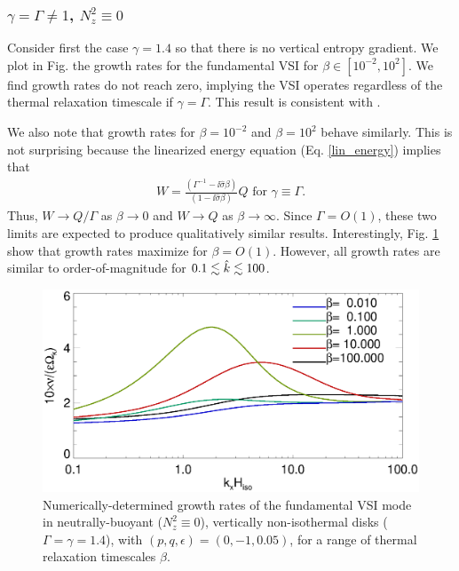 \subsubsection{$\gamma=\Gamma \neq 1$, $N_z^2\equiv 0$}
Consider first the case $\gamma=1.4$ so that there is no vertical
entropy gradient. We plot in Fig. the growth rates for the
fundamental VSI for $\beta\in[10^{-2},10^{2}]$. We find growth rates
do not reach zero, implying the VSI operates regardless of the thermal
relaxation timescale if $\gamma=\Gamma$. This result is consistent
with \cite{nelson13}.  

We also note that growth rates for $\beta = 10^{-2}$ and
$\beta=10^{2}$ behave similarly. This is not surprising because
the linearized energy equation (Eq. \ref{lin_energy}) implies that 
\begin{align}
  W = \frac{\left(\Gamma^{-1} -
      \ii\hat{\sigma}\beta\right)}{\left(1-\ii\hat{\sigma}\beta\right)}
  Q \text{ for } \gamma\equiv \Gamma.   
\end{align}
Thus, $W \to Q/\Gamma$ as $\beta\to0$ and $W\to Q$ as
$\beta\to\infty$. Since $\Gamma=O(1)$, these two limits are expected
to produce qualitatively similar results. Interestingly,
Fig. \ref{growth_vnoniso1} show that growth rates 
maximize for $\beta=O(1)$. However, all growth rates are similar to
order-of-magnitude for $0.1\lesssim\hat{k}\lesssim 100$. 

\begin{figure}
  \includegraphics[width=\linewidth,clip=true,trim=0cm 0cm 0cm
  0cm]{figures/growth_vnoniso1} 
  \caption{Numerically-determined growth rates of the fundamental VSI
    mode in neutrally-buoyant ($N_z^2\equiv0$), vertically non-isothermal disks
    ($\Gamma=\gamma=1.4$), with $(p,q,\epsilon)=(0,-1,0.05)$, for
    a range of thermal relaxation timescales 
    $\beta$. \label{growth_vnoniso1}}     
\end{figure} 

